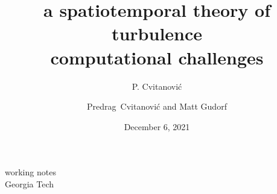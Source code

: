 



\usepackage[font=scriptsize, labelfont=bf]{caption}
\usepackage[
    backend=biber,  %
    sorting=nyt,
    style=numeric, %
    natbib=true,
    style=phys, %
    biblabel= brackets, %
    articletitle=false, %
    pageranges = true , %
    sortlocale=en_US,
    giveninits=true,
    url=false, %
    doi=false, %
    eprint=false
]{biblatex}


\renewcommand{\Ssym}[1]{{\ensuremath{m_{#1}}}}    %

\makeatletter
\let\@@magyar@captionfix\relax
\makeatother




\title{
{a spatiotemporal theory of}
{\huge turbulence}
    \\
{computational challenges}
}
\author{P. Cvitanovi\'c}
\author[Cvitanovi\'c]
{
  \textcolor{green!50!black}{
  {Predrag~Cvitanovi\'c
  and
  Matt Gudorf
  }	%
  }
}
\institute
{
working notes
\\
                Georgia Tech
 }
\date{December 6, 2021}

